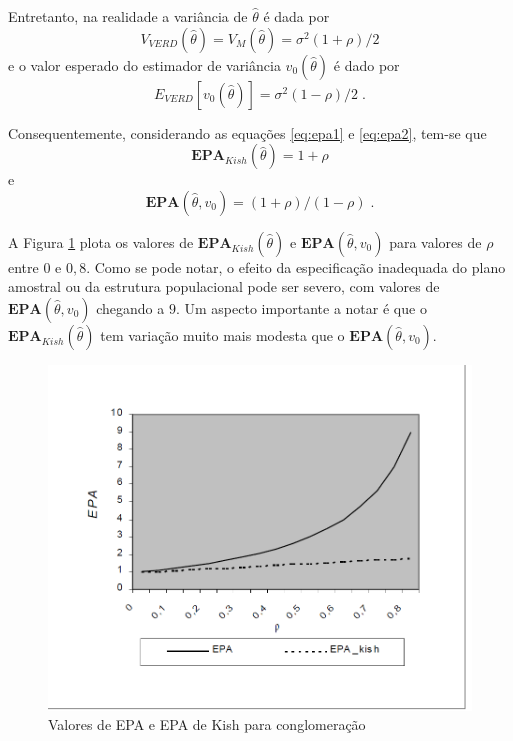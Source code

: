 \documentclass[]{book}
\theoremstyle{definition}
\theoremstyle{definition}
\theoremstyle{definition}
\theoremstyle{remark}
\begin{document}
Entretanto, na realidade a variância de \(\widehat{\theta }\) é dada por
\[
V_{VERD}\left( \widehat{\theta }\right) =V_{M}\left( \widehat{\theta }
\right) =\sigma ^{2}(1+\rho )/2 
\] e o valor esperado do estimador de variância
\(v_{0}\left( \widehat{\theta }\right)\) é dado por \[
E_{VERD}\left[ v_{0}\left( \widehat{\theta }\right) \right] =\sigma
^{2}(1-\rho )/2\;. 
\]

Consequentemente, considerando as equações \eqref{eq:epa1} e
\eqref{eq:epa2}, tem-se que \[
\mathbf{EPA}_{Kish}\left( \hat{\theta}\right) =1+\rho 
\] e \[
\mathbf{EPA}\left( \hat{\theta},v_{0}\right) =(1+\rho )/(1-\rho )\;. 
\]

A Figura \ref{fig:epacong} plota os valores de
\(\mathbf{EPA}_{Kish}\left( \hat{\theta}\right)\) e
\(\mathbf{EPA}\left( \hat{\theta},v_{0}\right)\) para valores de
\(\rho\) entre \(0\) e \(0,8\). Como se pode notar, o efeito da
especificação inadequada do plano amostral ou da estrutura populacional
pode ser severo, com valores de
\(\mathbf{EPA}\left( \hat{\theta},v_{0}\right)\) chegando a \(9\). Um
aspecto importante a notar é que o
\(\mathbf{EPA}_{Kish}\left( \hat{\theta}\right)\) tem variação muito
mais modesta que o \(\mathbf{EPA}\left( \hat{\theta},v_{0}\right)\).

\begin{figure}
\centering
\includegraphics{Figuras/fig41.png}
\caption{\label{fig:epacong}Valores de EPA e EPA de Kish para conglomeração}
\end{figure}
\end{document}
